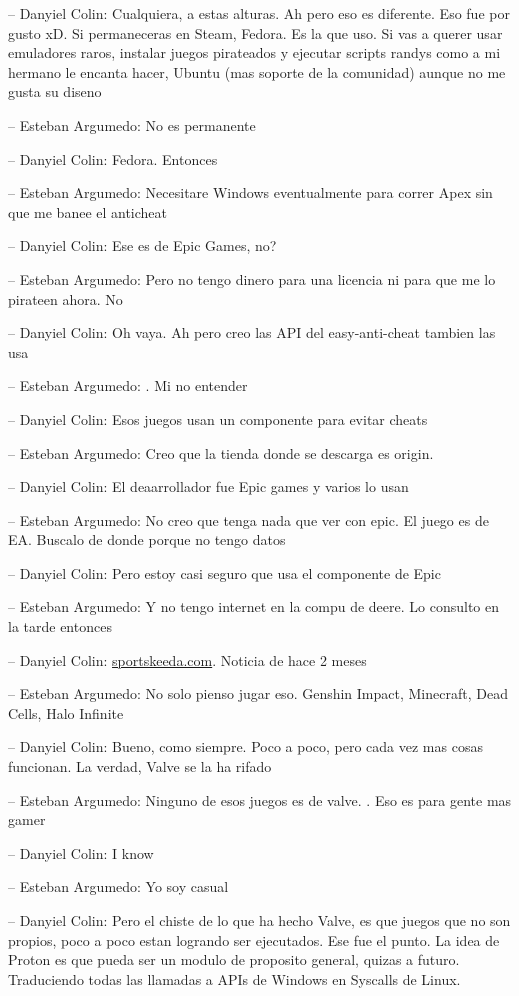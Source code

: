 -- Danyiel Colin: Cualquiera, a estas alturas. Ah pero eso es diferente.
Eso fue por gusto xD. Si permaneceras en Steam, Fedora. Es la que uso.
Si vas a querer usar emuladores raros, instalar juegos pirateados y
ejecutar scripts randys como a mi hermano le encanta hacer, Ubuntu (mas
soporte de la comunidad) aunque no me gusta su diseno

-- Esteban Argumedo: No es permanente

-- Danyiel Colin: Fedora. Entonces

-- Esteban Argumedo: Necesitare Windows eventualmente para correr Apex
sin que me banee el anticheat

-- Danyiel Colin: Ese es de Epic Games, no?

-- Esteban Argumedo: Pero no tengo dinero para una licencia ni para que
me lo pirateen ahora. No

-- Danyiel Colin: Oh vaya. Ah pero creo las API del easy-anti-cheat
tambien las usa

-- Esteban Argumedo: . Mi no entender

-- Danyiel Colin: Esos juegos usan un componente para evitar cheats

-- Esteban Argumedo: Creo que la tienda donde se descarga es origin.

-- Danyiel Colin: El deaarrollador fue Epic games y varios lo usan

-- Esteban Argumedo: No creo que tenga nada que ver con epic. El juego
es de EA. Buscalo de donde porque no tengo datos

-- Danyiel Colin: Pero estoy casi seguro que usa el componente de Epic

-- Esteban Argumedo: Y no tengo internet en la compu de deere. Lo
consulto en la tarde entonces

-- Danyiel Colin:
\href{https://www.sportskeeda.com/esports/news-apex-legends-finally-playable-linux}{sportskeeda.com}.
Noticia de hace 2 meses

-- Esteban Argumedo: No solo pienso jugar eso. Genshin Impact,
Minecraft, Dead Cells, Halo Infinite

-- Danyiel Colin: Bueno, como siempre. Poco a poco, pero cada vez mas
cosas funcionan. La verdad, Valve se la ha rifado

-- Esteban Argumedo: Ninguno de esos juegos es de valve. . Eso es para
gente mas gamer

-- Danyiel Colin: I know

-- Esteban Argumedo: Yo soy casual

-- Danyiel Colin: Pero el chiste de lo que ha hecho Valve, es que juegos
que no son propios, poco a poco estan logrando ser ejecutados. Ese fue
el punto. La idea de Proton es que pueda ser un modulo de proposito
general, quizas a futuro. Traduciendo todas las llamadas a APIs de
Windows en Syscalls de Linux.

